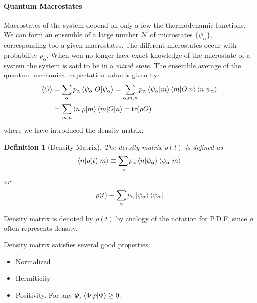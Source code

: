 \documentclass{article}
\numberwithin{equation}{subsection} %
\newtheorem{defi}{Definition}[section]
\theoremstyle{definition}
\begin{document}
    \paragraph{Quantum Macrostates}
    Macrostates of the system depend on only a few the thermodynamic
    functions. We can form an ensemble of a large number $\mathcal{N}$ of
    microstates $\{\psi_\alpha\}$, corresponding too a given macrostates.
    The different microstates occur with probability $p_\alpha$.
    When wen no longer have exact knowledge of the microstate of a
    system the system is said to be in a \textit{mixed state}.
    The ensemble average of the quantum mechanical expectation
    value is given by:
    \begin{align}
        \label{eq:quantum_macrostates_ensemble_avg}
        \bar{\braket{O}} &= 
            \sum_\alpha p_\alpha \braket{\psi_\alpha|O|\psi_\alpha}
            = \sum_{\alpha,m,n} p_\alpha
                \braket{\psi_\alpha|m}\braket{m|O|n}\braket{n|\psi_\alpha}
                \nonumber\\
            &= \sum_{m,n} \braket{n|\rho|m}\braket{m|O|n}
                = \text{tr}(\rho O)
    \end{align}
    where we have introduced the density matrix:
    \begin{defi}[Density Matrix]
        The density matrix $\rho(t)$ is defined as
        \begin{align}
            \label{eq:density_matrix_def}
        \braket{n|\rho(t)|m} \equiv
        \sum_\alpha p_\alpha \braket{n|\psi_\alpha} \braket{\psi_\alpha|m}
        \end{align}
        or
        \begin{align}
            \label{eq:density_matrix_def_2}
            \rho(t) \equiv \sum_\alpha p_\alpha
                \ket{\psi_\alpha}\bra{\psi_\alpha}
        \end{align}
    \end{defi}
    Density matrix is denoted by $\rho(t)$ by analogy of the notation for
    P.D.F, since $\rho$ often represents density.
    
    Density matrix satisfies several good properties:
    \begin{itemize}
        \item Normalized
        \item Hermiticity
        \item Positivity. For any $\Phi$, $\braket{\Phi|\rho|\Phi} \geq 0$.
    \end{itemize}
\end{document}
